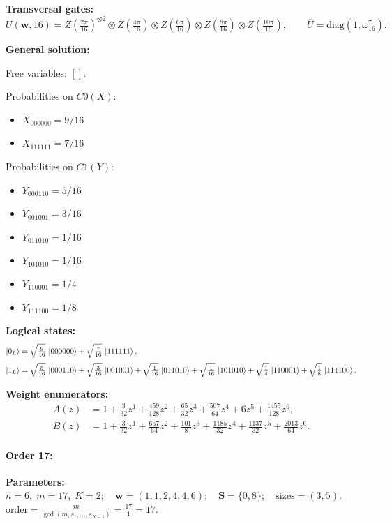 \documentclass[11pt]{article}
\begin{document}
\noindent\textbf{Transversal gates:}
\[
    U(\mathbf w,16)=Z \left(\tfrac{2\pi}{16}\right)^{\otimes2} \otimes Z \left(\tfrac{4\pi}{16}\right) \otimes Z \left(\tfrac{6\pi}{16}\right) \otimes Z \left(\tfrac{8\pi}{16}\right) \otimes Z \left(\tfrac{10\pi}{16}\right),\qquad
    \overline U=\mathrm{diag}(1,\omega_{16}^{7}).
\]

\noindent\textbf{General solution:}

Free variables: $[]$.

Probabilities on $C0 (X)$:
\begin{itemize}
    \item $X_{000000} = 9/16$
    \item $X_{111111} = 7/16$
\end{itemize}

Probabilities on $C1 (Y)$:
\begin{itemize}
    \item $Y_{000110} = 5/16$
    \item $Y_{001001} = 3/16$
    \item $Y_{011010} = 1/16$
    \item $Y_{101010} = 1/16$
    \item $Y_{110001} = 1/4$
    \item $Y_{111100} = 1/8$
\end{itemize}

\noindent\textbf{Logical states:}
\begin{align*}
\ket{0_L} &= \sqrt{\tfrac{9}{16}}\,\ket{000000} + \sqrt{\tfrac{7}{16}}\,\ket{111111},
\\[2pt]
\ket{1_L} &= \sqrt{\tfrac{5}{16}}\,\ket{000110} + \sqrt{\tfrac{3}{16}}\,\ket{001001} + \sqrt{\tfrac{1}{16}}\,\ket{011010} + \sqrt{\tfrac{1}{16}}\,\ket{101010} + \sqrt{\tfrac{1}{4}}\,\ket{110001} + \sqrt{\tfrac{1}{8}}\,\ket{111100}.
\end{align*}

\noindent\textbf{Weight enumerators:}
\begin{align*}
A(z) &= 1 + \tfrac{3}{32}z^{1} + \tfrac{459}{128}z^{2} + \tfrac{65}{32}z^{3} + \tfrac{507}{64}z^{4} + 6z^{5} + \tfrac{1455}{128}z^{6},\\[2pt]
B(z) &= 1 + \tfrac{3}{32}z^{1} + \tfrac{657}{64}z^{2} + \tfrac{101}{8}z^{3} + \tfrac{1185}{32}z^{4} + \tfrac{1137}{32}z^{5} + \tfrac{2013}{64}z^{6}.
\end{align*}

\paragraph{\textbf{Order 17:}}
\noindent\textbf{Parameters:} $n=6,\; m=17,\; K=2;\quad \mathbf w=(1, 1, 2, 4, 4, 6);\quad \mathbf S=\{0, 8\};\quad \text{sizes}=\left(3, 5\right).$ $\displaystyle \text{order}=\frac{m}{\gcd(m,s_1,\dots,s_{K-1})}=\frac{17}{1}=17.$
\end{document}
